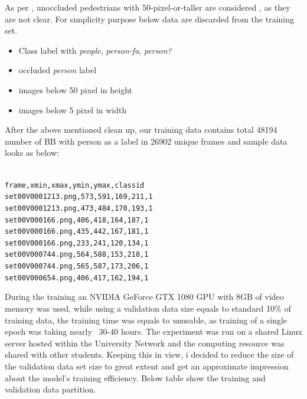 
As per \cite{walk2010new}, unoccluded pedestrians with 50-pixel-or-taller are considered , as they are not clear. For simplicity purpose below data are discarded from the training set.
\begin{itemize}
	\item Class label with \textit{people}, \textit{person-fa}, \textit{person?}
	\item occluded \textit{person} label
	\item images below 50 pixel in height
	\item images below 5 pixel in width
\end{itemize}

After the above mentioned clean up, our training data contains total 48194 number of BB with person as a label in 26902 unique frames and sample data looks as below:
\begin{center}
\texttt{  \\
frame,xmin,xmax,ymin,ymax,class\textunderscore id \\
set00\textunderscore V000\textunderscore 1213.png,573,591,169,211,1 \\
set00\textunderscore V000\textunderscore 1213.png,473,484,170,193,1 \\
set00\textunderscore V000\textunderscore 166.png,406,418,164,187,1 \\
set00\textunderscore V000\textunderscore 166.png,435,442,167,181,1 \\
set00\textunderscore V000\textunderscore 166.png,233,241,120,134,1 \\
set00\textunderscore V000\textunderscore 744.png,564,588,153,218,1 \\
set00\textunderscore V000\textunderscore 744.png,565,587,173,206,1 \\
set00\textunderscore V000\textunderscore 654.png,406,417,162,194,1 \\
}
\end{center}

During the training an NVIDIA GeForce GTX 1080 GPU with 8GB of video memory was used, while using a validation data size equals to standard 10\% of training data, the training time was equals to unusable, as training of a single epoch was taking nearly ~30-40 hours. The experiment was run on a shared Linux server hosted within the University Network and the computing resource was shared with other students. Keeping this in view, i decided to reduce the size of the validation data set size to great extent and get an approximate impression about the model's training efficiency. Below table show the training and validation data partition.

